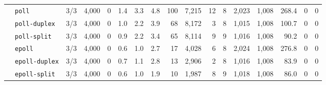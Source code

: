\begin{longtable}{@{}llrrrrrrrrrrrrrrr@{}}
 & \texttt{poll} & 3/3 & 4{,}000 & 0 & 1.4 & 3.3 & 4.8 & 100 & 7{,}215 & 12 & 8 & 2{,}023 & 1{,}008 & 268.4 & 0 & 0 \\
 & \texttt{poll-duplex} & 3/3 & 4{,}000 & 0 & 1.0 & 2.2 & 3.9 & 68 & 8{,}172 & 3 & 8 & 1{,}015 & 1{,}008 & 100.7 & 0 & 0 \\
 & \texttt{poll-split} & 3/3 & 4{,}000 & 0 & 0.9 & 2.2 & 3.4 & 65 & 8{,}114 & 9 & 9 & 1{,}016 & 1{,}008 & 90.2 & 0 & 0 \\
 & \texttt{epoll} & 3/3 & 4{,}000 & 0 & 0.6 & 1.0 & 2.7 & 17 & 4{,}028 & 6 & 8 & 2{,}024 & 1{,}008 & 276.8 & 0 & 0 \\
 & \texttt{epoll-duplex} & 3/3 & 4{,}000 & 0 & 0.7 & 1.1 & 2.8 & 13 & 2{,}906 & 2 & 8 & 1{,}016 & 1{,}008 & 83.9 & 0 & 0 \\
 & \texttt{epoll-split} & 3/3 & 4{,}000 & 0 & 0.6 & 1.0 & 1.9 & 10 & 1{,}987 & 8 & 9 & 1{,}018 & 1{,}008 & 86.0 & 0 & 0 \\
\end{longtable}
